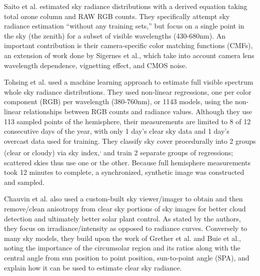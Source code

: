 
Saito et al. estimated sky radiance distributions with a derived equation taking total ozone column and RAW RGB counts.\cite{saito_estimation_2016} They specifically attempt sky radiance estimation \enquote{without any training sets,}\cite{saito_estimation_2016} but focus on a single point in the sky (the zenith) for a subset of visible wavelengths (430-680nm). An important contribution is their camera-specific color matching functions (CMFs), an extension of work done by Sigernes et al.,\cite{sigernes_sensitivity} which take into account camera lens wavelength dependence, vignetting effect, and CMOS noise.\cite{saito_estimation_2016} 

Tohsing et al. used a machine learning approach to estimate full visible spectrum whole sky radiance distributions. They used non-linear regressions, one per color component (RGB) per wavelength (380-760nm), or 1143 models, using the non-linear relationships between RGB counts and radiance values.\cite{tohsing_validation_2014} Although they use 113 sampled points of the hemisphere, their measurements are limited to 8 of 12 consecutive days of the year, with only 1 day's clear sky data and 1 day's overcast data used for training.\cite{tohsing_validation_2014} They classify sky cover procedurally into 2 groups (clear or cloudy) via sky index,\textsuperscript{,} and train 2 separate groups of regressions; scattered skies thus use one or the other. Because full hemisphere measurements took 12 minutes to complete, a synchronized, synthetic image was constructed and sampled.

Chauvin et al. also used a custom-built sky viewer/imager to obtain and then remove/clean anisotropy from clear sky portions of sky images for better cloud detection and ultimately better solar plant control.\cite{chauvin_modelling_2015} As stated by the authors, they focus on irradiance/intensity as opposed to radiance curves. Conversely to many sky models, they build upon the work of Grether et al. and Buie et al., noting the importance of the circumsolar region and its ratios along with the central angle from sun position to point position, sun-to-point angle (SPA), and explain how it can be used to estimate clear sky radiance.\cite{chauvin_modelling_2015}

